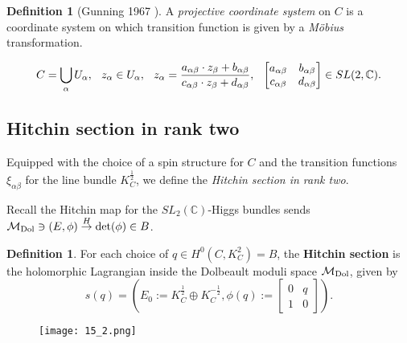 \documentclass[oneside, 11pt]{amsart}
\theoremstyle{definition}
\newtheorem{Def}[thm]{Definition}
\numberwithin{equation}{subsection}
\def\a{\alpha}
\def\b{\beta}
\def\Dol{{\text{\rm{Dol}}}}
\newcommand{\bC}{{\mathbb{C}}}
\newcommand{\cM}{{\mathcal{M}}}
\newcommand{\half}{{\frac{1}{2}}}
\begin{document}
\begin{Def}[Gunning 1967 \cite{Gun}]\label{gun}
A \textit{projective coordinate system} on $C$ is a coordinate system on which transition function is given by a \emph{M\"obius} transformation.
\end{Def}
$$
C = \bigcup_\a U_\a, \hskip .1in z_\a\in U_{\a}, \hskip .1in z_\a = \frac{a_{\a\b} \cdot z_\b + b_{\a\b}}
{c_{\a\b}\cdot z_\b + d_{\a\b}}, 
 \hskip .1in
\begin{bmatrix}
a_{\a\b}&b_{\a\b}\\
c_{\a\b}&d_{\a\b}
\end{bmatrix}
\in SL(2,\bC).
$$ 

\subsection{Hitchin section in rank two}\label{HC rank 2}

Equipped with the choice of a spin structure for $C$ and   the transition functions
$\xi_{\a\b}$ for the line bundle $K_C^\half$, we  define the \textit{Hitchin section in rank two}.

Recall the Hitchin map for the $SL_2(\mathbb{C})$-Higgs bundles sends $\cM_{\Dol}\owns
(E,\phi)\stackrel{H}{\rightarrow}\det(\phi)\in B$. 
\begin{Def}\label{section}
For each choice of $q\in  H^0(C, K_C^2)=B$, the \textbf{Hitchin section} is the holomorphic Lagrangian inside the Dolbeault moduli space $\mathcal{M}_{\Dol}$, given by 
$$s(q)=\left(E_0:=K_C^{\frac{1}{2}}\oplus K_C^{-\frac{1}{2}}, \phi(q):=\begin{bmatrix}
0&q\\
1&0
\end{bmatrix}\right)
.$$

\end{Def}


\begin{figure}[htb]
\texttt{[image: 15\_2.png]}
\end{figure}
\end{document}
